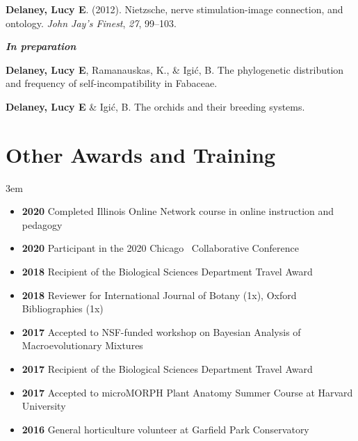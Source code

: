 \documentclass[]{article}
\newlength{\cslhangindent}
\newenvironment{cslreferences}
{\setlength{\parindent}{0pt}
\everypar{\setlength{\hangindent}{\cslhangindent}}\ignorespaces}
{\par}
\begin{document}
\begin{cslreferences}
\textbf{Delaney, Lucy E}. (2012). Nietzsche, nerve stimulation-image connection, and ontology. \emph{John Jay's Finest}, \emph{27}, 99--103. \href{https://ledelaney.org/static/docs/Delaney-JJAYFinest.pdf}{\faFile}\\
\end{cslreferences}

\textbf{\textit{In preparation}}
\vspace{2mm}

\begin{cslreferences}
\textbf{Delaney, Lucy E}, Ramanauskas, K., \& Igić, B. The phylogenetic distribution and frequency of self-incompatibility in Fabaceae.

\textbf{Delaney, Lucy E} \& Igić, B. The orchids and their breeding systems.\\
\end{cslreferences}
\vspace{2mm}

\section{Other Awards and Training}

\vspace{2mm}
\leftskip 3em

\begin{itemize}[label=$\mathwitch*$]
\item{\textbf{2020} Completed Illinois Online Network course in online instruction and pedagogy}
\item{\textbf{2020} Participant in the 2020 Chicago \textcolor{light-gray}{\faRProject}\ Collaborative Conference \href{https://chircollab.github.io/}{\faLink}}
\item{\textbf{2018} Recipient of the Biological Sciences Department Travel Award}
\item{\textbf{2018} Reviewer for International Journal of Botany (1x), Oxford Bibliographies (1x)}
\item{\textbf{2017} Accepted to NSF-funded workshop on Bayesian Analysis of Macroevolutionary Mixtures \href{http://bamm-project.org/index.html}{\faLink}}
\item{\textbf{2017} Recipient of the Biological Sciences Department Travel Award}
\item{\textbf{2017} Accepted to microMORPH Plant Anatomy Summer Course at Harvard University \href{https://web.archive.org/web/20170922060558/http://arboretum.harvard.edu/tracing-evolution-form-function/"}{\faLink}}
\item{\textbf{2016} General horticulture volunteer at Garfield Park Conservatory \href{https://garfieldconservatory.org/}{\faLink}}
\end{itemize}
\end{document}

